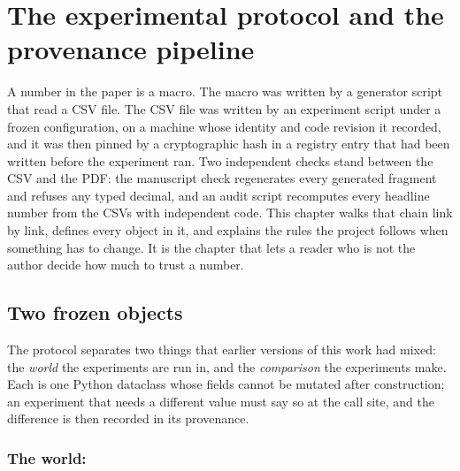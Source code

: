 \chapter{The experimental protocol and the provenance pipeline}
\label{ch:protocol}

A number in the paper is a macro. The macro was written by a generator script that read
a CSV file. The CSV file was written by an experiment script under a frozen
configuration, on a machine whose identity and code revision it recorded, and it was
then pinned by a cryptographic hash in a registry entry that had been written before the
experiment ran. Two independent checks stand between the CSV and the PDF: the manuscript
check regenerates every generated fragment and refuses any typed decimal, and an audit
script recomputes every headline number from the CSVs with independent code. This
chapter walks that chain link by link, defines every object in it, and explains the
rules the project follows when something has to change. It is the chapter that lets a
reader who is not the author decide how much to trust a number.

\section{Two frozen objects}
\label{sec:frozen}

The protocol separates two things that earlier versions of this work had mixed: the
\emph{world} the experiments are run in, and the \emph{comparison} the experiments make.
Each is one Python dataclass whose fields cannot be mutated after construction; an
experiment that needs a different value must say so at the call site, and the
difference is then recorded in its provenance.

\subsection{The world: }

